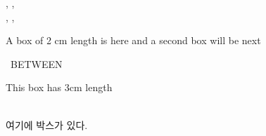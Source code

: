 \documentclass[11pt]{article}
\begin{document}


, ,  \\

, ,  \\

\parbox{2in}{A box of 2 cm length is here and a second box will be next} \ \hfill BETWEEN \ \hfill \parbox{3cm}{This box has 3cm length} \\

여기에 \hfill {} \hfill 박스가 있다.
\end{document}
